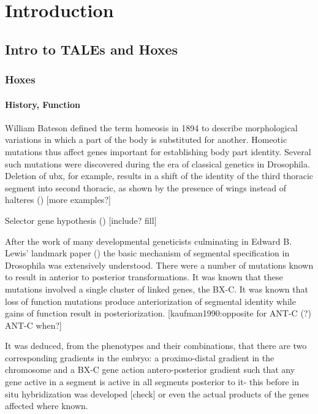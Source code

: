 \chapter{Introduction}


\label{chp:intro}

\section{Intro to TALEs and Hoxes}

\subsection{Hoxes}

\subsubsection{History, Function}

William Bateson defined the term homeosis in 1894 to describe morphological variations in which a part of the body is substituted for another. Homeotic mutations thus affect genes important for establishing body part identity. Several such mutations were discovered during the era of classical genetics in Drosophila. Deletion of \ac{ubx}, for example, results in a shift of the identity of the third thoracic segment into second thoracic, as shown by the presence of wings instead of halteres (\cite{ref}) [more examples?]

Selector gene hypothesis (\cite{Garcia-Bellido1975,Garcia-Bellido1977}) [include? fill]

After the work of many developmental geneticists culminating in Edward B. Lewis' landmark paper (\cite{Lewis1978}) the basic mechanism of segmental specification in Drosophila was extensively understood. There were a number of mutations known to result in anterior to posterior transformations. It was known that these mutations involved a single cluster of linked genes, the \ac{BX-C}. It was known that loss of function mutations produce anteriorization of segmental identity while gains of function result in posteriorization. [kaufman1990:opposite for \ac{ANT-C} (?) \ac{ANT-C} when?]

It was deduced, from the phenotypes and their combinations, that there are two corresponding gradients in the embryo: a proximo-distal gradient in the chromosome and a \ac{BX-C} gene action antero-posterior gradient such that any gene active in a segment is active in all segments posterior to it- this before in situ hybridization was developed [check] or even the actual products of the genes affected where known.


